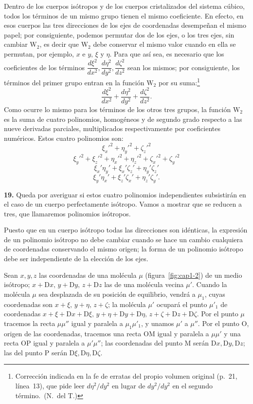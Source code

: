 Dentro de los cuerpos isótropos y de los cuerpos cristalizados del sistema
cúbico, todos los términos de un mismo grupo tienen el mismo coeficiente.
En efecto, en esos cuerpos las tres direcciones de los ejes de coordenadas
desempeñan el mismo papel; por consiguiente, podemos permutar dos de los
ejes, o los tres ejes, sin cambiar $\mathrm{W}_2$, es decir que
$\mathrm{W}_2$ debe conservar el mismo valor cuando en ella se permutan,
por ejemplo, $x$ e $y$, $\xi$ y $\eta$. Para que así sea, es necesario que
los coeficientes de los términos $\dfrac{d\xi^2}{dx^2},\dfrac{d\eta^2}{dy^2},
\dfrac{d\zeta^2}{dz^2}$ sean los mismos; por consiguiente, los términos del
primer grupo entran en la función $\mathrm{W}_2$ por su suma:\footnote{Corrección
indicada en la fe de erratas del propio volumen original (p.~21,
línea~13), que pide leer $d\eta^2/dy^2$ en lugar de $dy^2/dy^2$ en el
segundo término.~(N.~del T.)}
\[
\frac{d\xi^2}{dx^2}+\frac{d\eta^2}{dy^2}+\frac{d\zeta^2}{dz^2}.
\]
Como ocurre lo mismo para los términos de los otros tres grupos, la función
$\mathrm{W}_2$ es la suma de cuatro polinomios, homogéneos y de segundo
grado respecto a las nueve derivadas parciales, multiplicados
respectivamente por coeficientes numéricos. Estos cuatro polinomios son:
\[
\xi_x'^2+\eta_y'^2+\zeta_z'^2
\]
\[
\xi_y'^2+\xi_z'^2+\eta_x'^2+\eta_z'^2+\zeta_x'^2+\zeta_y'^2
\]
\[
\xi_x'\eta_y'+\xi_x'\zeta_z'+\eta_y'\zeta_z'
\]
\[
\xi_y'\eta_x'+\xi_z'\zeta_x'+\eta_z'\zeta_y'.
\]

\noindent\textbf{19.} Queda por averiguar si estos cuatro polinomios
independientes subsistirán en el caso de un cuerpo perfectamente isótropo.
Vamos a mostrar que se reducen a tres, que llamaremos polinomios isótropos.

Puesto que en un cuerpo isótropo todas las direcciones son idénticas, la
expresión de un polinomio isótropo no debe cambiar cuando se hace un cambio
cualquiera de coordenadas conservando el mismo origen; la forma de un
polinomio isótropo debe ser independiente de la elección de los ejes.

Sean $x,y,z$ las coordenadas de una molécula $\mu$ (figura~\ref{fig:cap1-2})
de un medio isótropo; $x+\mathrm{D}x,\,y+\mathrm{D}y,\,z+\mathrm{D}z$ las de
una molécula vecina $\mu'$. Cuando la molécula $\mu$ sea desplazada de su
posición de equilibrio, vendrá a $\mu_1$, cuyas coordenadas son
$x+\xi,\,y+\eta,\,z+\zeta$; la molécula $\mu'$ ocupará el punto $\mu'_1$ de
coordenadas $x+\xi+\mathrm{D}x+\mathrm{D}\xi,\,y+\eta+\mathrm{D}y+\mathrm{D}\eta,
\,z+\zeta+\mathrm{D}z+\mathrm{D}\zeta$. Por el punto $\mu$ tracemos la recta
$\mu\mu''$ igual y paralela a $\mu_1\mu'_1$, y unamos $\mu'$ a $\mu''$. Por
el punto $\mathrm{O}$, origen de las coordenadas, tracemos una recta
$\mathrm{OM}$ igual y paralela a $\mu\mu'$ y una recta $\mathrm{OP}$ igual y
paralela a $\mu'\mu''$; las coordenadas del punto $\mathrm{M}$ serán
$\mathrm{D}x,\mathrm{D}y,\mathrm{D}z$; las del punto $\mathrm{P}$ serán
$\mathrm{D}\xi,\mathrm{D}\eta,\mathrm{D}\zeta$.


